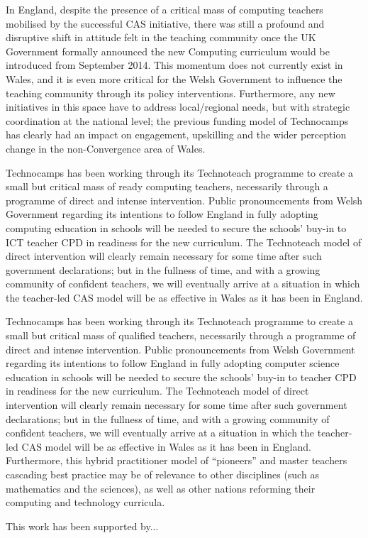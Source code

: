 In England, despite the presence of a critical mass of computing
teachers mobilised by the successful CAS initiative, there was still a
profound and disruptive shift in attitude felt in the teaching
community once the UK Government formally announced the new Computing
curriculum would be introduced from September 2014.  This momentum
does not currently exist in Wales, and it is even more critical for
the Welsh Government to influence the teaching community through its
policy interventions. Furthermore, any new initiatives in this space
have to address local/regional needs, but with strategic coordination
at the national level; the previous funding model of Technocamps has
clearly had an impact on engagement, upskilling and the wider
perception change in the non-Convergence area of Wales.

Technocamps has been working through its Technoteach programme to
create a small but critical mass of ready computing teachers,
necessarily through a programme of direct and intense intervention.
Public pronouncements from Welsh Government regarding its intentions
to follow England in fully adopting computing education in schools
will be needed to secure the schools' buy-in to ICT teacher CPD in
readiness for the new curriculum.  The Technoteach model of direct
intervention will clearly remain necessary for some time after such
government declarations; but in the fullness of time, and with a
growing community of confident teachers, we will eventually arrive at
a situation in which the teacher-led CAS model will be as effective in
Wales as it has been in England.

Technocamps has been working through its Technoteach programme to
create a small but critical mass of qualified teachers,
necessarily through a programme of direct and intense intervention.
Public pronouncements from Welsh Government regarding its intentions
to follow England in fully adopting computer science education in schools
will be needed to secure the schools' buy-in to teacher CPD in
readiness for the new curriculum.  The Technoteach model of direct
intervention will clearly remain necessary for some time after such
government declarations; but in the fullness of time, and with a
growing community of confident teachers, we will eventually arrive at
a situation in which the teacher-led CAS model will be as effective in
Wales as it has been in England. Furthermore, this hybrid practitioner
model of ``pioneers'' and master teachers cascading best practice may
be of relevance to other disciplines (such as mathematics and the
sciences), as well as other nations reforming their computing and
technology curricula.

\begin{acks}
This work has been supported by...
\end{acks}



